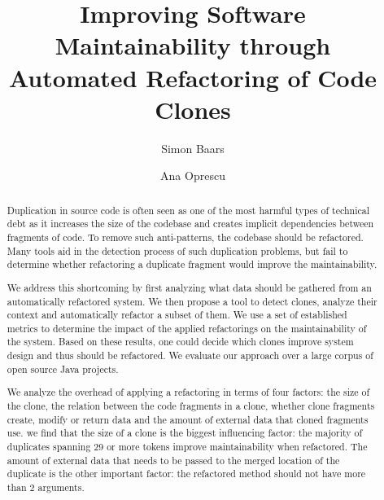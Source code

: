 \documentclass[sigconf,review, table]{acmart}
\begin{document}
\title{Improving Software Maintainability through Automated Refactoring of Code Clones}

\author{Simon Baars}

\author{Ana Oprescu}

\begin{abstract}
Duplication in source code is often seen as one of the most harmful types of technical debt as it increases the size of the codebase and creates implicit dependencies between fragments of code. To remove such anti-patterns, the codebase should be refactored. Many tools aid in the detection process of such duplication problems, but fail to determine whether refactoring a duplicate fragment would improve the maintainability.

We address this shortcoming by first analyzing what data should be gathered from an automatically refactored system. We then propose a tool to detect clones, analyze their context and automatically refactor a subset of them.
We use a set of established metrics to determine the impact of the applied refactorings on the maintainability of the system. Based on these results, one could decide which clones improve system design and thus should be refactored. We evaluate our approach over a large corpus of open source Java projects.

We analyze the overhead of applying a refactoring in terms of four factors: the size of the clone, the relation between the code fragments in a clone, whether clone fragments create, modify or return data and the amount of external data that cloned fragments use. we find that the size of a clone is the biggest influencing factor: the majority of duplicates spanning 29 or more tokens improve maintainability when refactored. The amount of external data that needs to be passed to the merged location of the duplicate is the other important factor: the refactored method should not have more than 2 arguments. %

\end{abstract}
\end{document}
